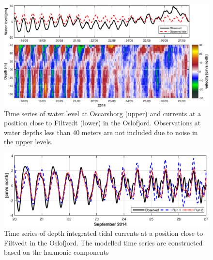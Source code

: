 \begin{figure}[!t]
\centering
\includegraphics[width=\textwidth]{fig_Filtvedt_timeseries_obs}
\caption{Time series of water level at Oscarsborg (upper) and currents at a position close to Filtvedt (lower) in the Oslofjord. Observations at water depths less than 40 meters are not included due to noise in the upper levels.}
\label{fig:Filtvedt_timeseries_obs}
\end{figure}


\begin{figure}[!t]
\centering
\includegraphics[width=\textwidth]{fig_Filtvedt_timeseries}
\caption{Time series of depth integrated tidal currents at a position close to Filtvedt in the Oslofjord. The modelled time series are constructed based on the harmonic components}
\label{fig:Filtvedt_timeseries}
\end{figure}



